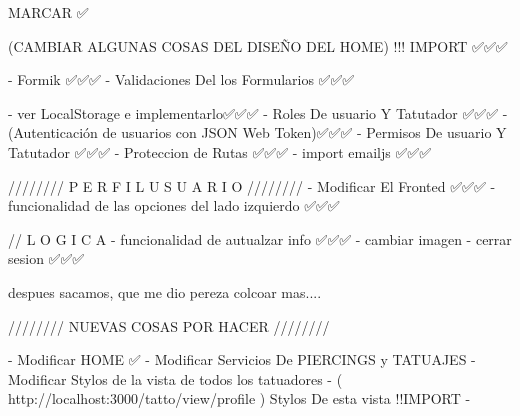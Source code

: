 
MARCAR ✅

(CAMBIAR ALGUNAS COSAS DEL DISEÑO DEL HOME) !!! IMPORT  ✅✅✅

    - Formik ✅✅✅
    - Validaciones Del los Formularios ✅✅✅

    - ver LocalStorage e implementarlo✅✅✅
    - Roles De usuario Y Tatutador ✅✅✅
    - (Autenticación de usuarios con JSON Web Token)✅✅✅
    - Permisos De usuario Y Tatutador ✅✅✅
    - Proteccion de Rutas ✅✅✅
    - import emailjs ✅✅✅



////////   P E R F I L   U S U A R I O   ////////  
    - Modificar El Fronted ✅✅✅
    - funcionalidad de las opciones del lado izquierdo ✅✅✅

    // L O G I C A
    - funcionalidad de autualzar info ✅✅✅
    - cambiar imagen
    - cerrar sesion ✅✅✅

despues sacamos, que me dio pereza colcoar mas....

////////   NUEVAS COSAS POR HACER    ////////  

    - Modificar HOME ✅
    - Modificar Servicios De PIERCINGS y TATUAJES
    - Modificar Stylos de la vista de todos los tatuadores 
    - ( http://localhost:3000/tatto/view/profile )  Stylos De esta vista !!IMPORT
    -


